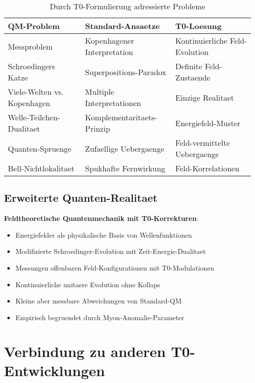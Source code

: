 \documentclass[12pt,a4paper]{article}
\begin{document}
	\begin{table}[htbp]
		\centering
		\small
		\begin{tabular}{|p{4cm}|p{5cm}|p{6cm}|}
			\hline
			\textbf{QM-Problem} & \textbf{Standard-Ansaetze} & \textbf{T0-Loesung} \\
			\hline
			Messproblem & Kopenhagener Interpretation & Kontinuierliche Feld-Evolution \\
			\hline
			Schroedingers Katze & Superpositions-Paradox & Definite Feld-Zustaende \\
			\hline
			Viele-Welten vs. Kopenhagen & Multiple Interpretationen & Einzige Realitaet \\
			\hline
			Welle-Teilchen-Dualitaet & Komplementaritaets-Prinzip & Energiefeld-Muster \\
			\hline
			Quanten-Spruenge & Zufaellige Uebergaenge & Feld-vermittelte Uebergaenge \\
			\hline
			Bell-Nichtlokalitaet & Spukhafte Fernwirkung & Feld-Korrelationen \\
			\hline
		\end{tabular}
		\caption{Durch T0-Formulierung adressierte Probleme}
	\end{table}
	
	\subsection{Erweiterte Quanten-Realitaet}
	
	\begin{tcolorbox}[colback=green!5!white,colframe=green!75!black,title=T0-Erweiterte Quanten-Realitaet]
		\textbf{Feldtheoretische Quantenmechanik mit T0-Korrekturen}:
		\begin{itemize}
			\item Energiefelder als physikalische Basis von Wellenfunktionen
			\item Modifizierte Schroedinger-Evolution mit Zeit-Energie-Dualitaet
			\item Messungen offenbaren Feld-Konfigurationen mit T0-Modulationen
			\item Kontinuierliche unitaere Evolution ohne Kollaps
			\item Kleine aber messbare Abweichungen von Standard-QM
			\item Empirisch begruendet durch Myon-Anomalie-Parameter
		\end{itemize}
	\end{tcolorbox}
	
	\section{Verbindung zu anderen T0-Entwicklungen}
	
\end{document}
